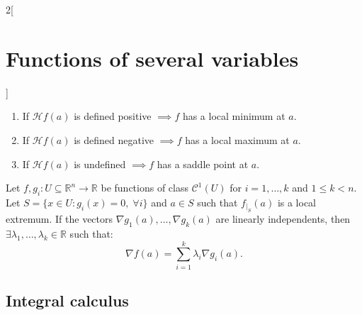 \documentclass[../../../main.tex]{subfiles}
\begin{document}
\begin{multicols}{2}[\section{Functions of several variables}]
\begin{theorem}
\begin{enumerate}
    \item If $\mathcal{H}f(a)$ is defined positive $\implies f$ has a local minimum at $a$.
    \item If $\mathcal{H}f(a)$ is defined negative $\implies f$ has a local maximum at $a$.
    \item If $\mathcal{H}f(a)$ is undefined $\implies f$ has a saddle point at $a$.
\end{enumerate}
\end{theorem}
\begin{theorem}
Let $f,g_i:U\subseteq\mathbb{R}^n\rightarrow\mathbb{R}$ be functions of class $\mathcal{C}^1(U)$ for $i=1,\ldots,k$ and $1\leq k<n$. Let $S=\{x\in U:g_i(x)=0,\;\forall i\}$ and $a\in S$ such that $f_{|_S}(a)$ is a local extremum. If the vectors $\nabla g_1(a),\ldots,\nabla g_k(a)$ are linearly independents, then $\exists\lambda_1,\ldots,\lambda_k\in\mathbb{R}$ such that: $$\nabla f(a)=\sum_{i=1}^k\lambda_i\nabla g_i(a).$$
\end{theorem}
\subsection{Integral calculus}

\end{multicols}
\end{document}
